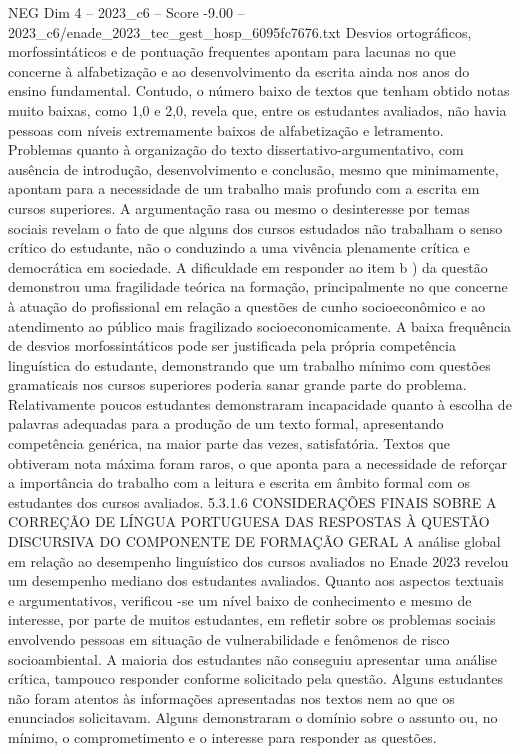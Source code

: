 \begin{textsample}{NEG Dim 4 – 2023\_c6 – Score -9.00 – 2023\_c6/enade\_2023\_tec\_gest\_hosp\_6095fc7676.txt}
Desvios ortográficos, morfossintáticos e de pontuação frequentes apontam para lacunas no que concerne à alfabetização e ao desenvolvimento da escrita ainda nos anos do ensino fundamental.
Contudo, o número baixo de textos que tenham obtido notas muito baixas, como 1,0 e 2,0, revela que, entre os estudantes avaliados, não havia pessoas com níveis extremamente baixos de alfabetização e letramento.
Problemas quanto à organização do texto dissertativo-argumentativo, com ausência de introdução, desenvolvimento e conclusão, mesmo que minimamente, apontam para a necessidade de um trabalho mais profundo com a escrita em cursos superiores.
A argumentação rasa ou mesmo o desinteresse por temas sociais revelam o fato de que alguns dos cursos estudados não trabalham o senso crítico do estudante, não o conduzindo a uma vivência plenamente crítica e democrática em sociedade.
A dificuldade em responder ao item b ) da questão demonstrou uma fragilidade teórica na formação, principalmente no que concerne à atuação do profissional em relação a questões de cunho socioeconômico e ao atendimento ao público mais fragilizado socioeconomicamente.
A baixa frequência de desvios morfossintáticos pode ser justificada pela própria competência linguística do estudante, demonstrando que um trabalho mínimo com questões gramaticais nos cursos superiores poderia sanar grande parte do problema.
Relativamente poucos estudantes demonstraram incapacidade quanto à escolha de palavras adequadas para a produção de um texto formal, apresentando competência genérica, na maior parte das vezes, satisfatória.
Textos que obtiveram nota máxima foram raros, o que aponta para a necessidade de reforçar a importância do trabalho com a leitura e escrita em âmbito formal com os estudantes dos cursos avaliados. 5.3.1.6 CONSIDERAÇÕES FINAIS SOBRE A CORREÇÃO DE LÍNGUA PORTUGUESA DAS RESPOSTAS À QUESTÃO DISCURSIVA DO COMPONENTE DE FORMAÇÃO GERAL A análise global em relação ao desempenho linguístico dos cursos avaliados no Enade 2023 revelou um desempenho mediano dos estudantes avaliados.
Quanto aos aspectos textuais e argumentativos, verificou -se um nível baixo de conhecimento e mesmo de interesse, por parte de muitos estudantes, em refletir sobre os problemas sociais envolvendo pessoas em situação de vulnerabilidade e fenômenos de risco socioambiental.
A maioria dos estudantes não conseguiu apresentar uma análise crítica, tampouco responder conforme solicitado pela questão.
Alguns estudantes não foram atentos às informações apresentadas nos textos nem ao que os enunciados solicitavam.
Alguns demonstraram o domínio sobre o assunto ou, no mínimo, o comprometimento e o interesse para responder as questões.

\end{textsample}
